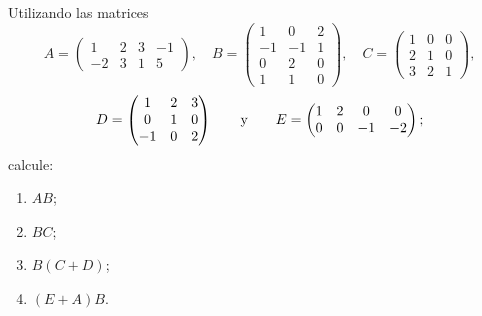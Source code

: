 \documentclass[a4,11pt]{aleph-notas}
\begin{document}
\begin{ejer}
    Utilizando las matrices
    \[
    A = \begin{pmatrix}1&2&3&-1\\-2&3&1&5\end{pmatrix}, \quad 
    B=\begin{pmatrix} 1 &0 &2 \\ -1& -1& 1\\ 0&2& 0 \\ 1& 1& 0\end{pmatrix}, \quad C=\begin{pmatrix}1&0&0\\2&1&0 \\3&2&1\end{pmatrix}, 
    \]
    \[
    D=\begin{pmatrix}1&2&3\\0&1&0\\-1&0&2\end{pmatrix} \qquad\text{y}\qquad E=\begin{pmatrix}1&2&0&0\\0&0&-1&-2\end{pmatrix};
    \] 
    calcule:
    \begin{enumerate}
        \item $AB$;
        \item $BC$;
        \item $B(C+D)$;
        \item $(E+A)B$.
    \end{enumerate}
\end{ejer}
\end{document}
